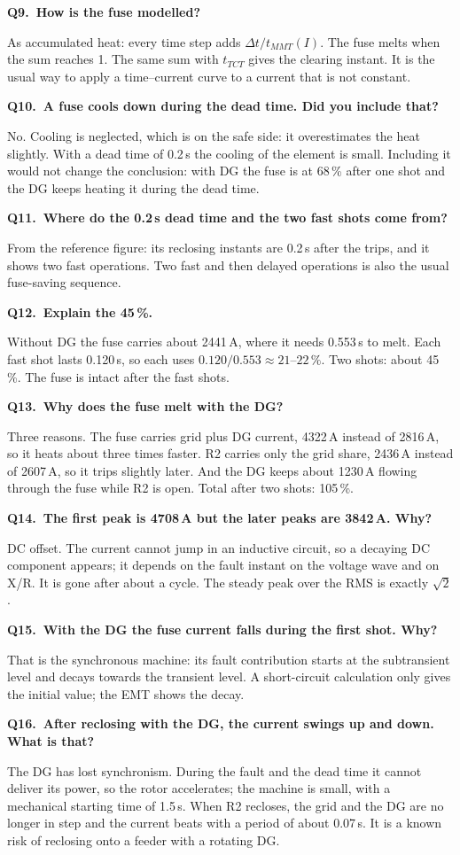 \documentclass[11pt,a4paper]{article}
\newcommand{\sub}[1]{\needspace{5\baselineskip}\medskip{\large\color{navy}\bfseries #1}\par}
\newcommand{\q}[2]{\par\needspace{4\baselineskip}\medskip\noindent\textbf{Q#1.\ #2}\par\noindent}
\begin{document}
\q{9}{How is the fuse modelled?}
As accumulated heat: every time step adds $\Delta t/t_{MMT}(I)$. The fuse melts when the sum reaches 1. The same
sum with $t_{TCT}$ gives the clearing instant. It is the usual way to apply a time--current curve to a current
that is not constant.

\q{10}{A fuse cools down during the dead time. Did you include that?}
No. Cooling is neglected, which is on the safe side: it overestimates the heat slightly. With a dead time of
0.2\,s the cooling of the element is small. Including it would not change the conclusion: with DG the fuse is
at 68\,\% after one shot and the DG keeps heating it during the dead time.

\q{11}{Where do the 0.2\,s dead time and the two fast shots come from?}
From the reference figure: its reclosing instants are 0.2\,s after the trips, and it shows two fast operations.
Two fast and then delayed operations is also the usual fuse-saving sequence.

\sub{The results}
\q{12}{Explain the 45\,\%.}
Without DG the fuse carries about 2441\,A, where it needs 0.553\,s to melt. Each fast shot lasts 0.120\,s, so
each uses $0.120/0.553\approx 21$--$22\,\%$. Two shots: about 45\,\%. The fuse is intact after the fast shots.

\q{13}{Why does the fuse melt with the DG?}
Three reasons. The fuse carries grid plus DG current, 4322\,A instead of 2816\,A, so it heats about three times
faster. R2 carries only the grid share, 2436\,A instead of 2607\,A, so it trips slightly later. And the DG
keeps about 1230\,A flowing through the fuse while R2 is open. Total after two shots: 105\,\%.

\q{14}{The first peak is 4708\,A but the later peaks are 3842\,A. Why?}
DC offset. The current cannot jump in an inductive circuit, so a decaying DC component appears; it depends on
the fault instant on the voltage wave and on X/R. It is gone after about a cycle. The steady peak over the RMS
is exactly $\sqrt{2}$.

\q{15}{With the DG the fuse current falls during the first shot. Why?}
That is the synchronous machine: its fault contribution starts at the subtransient level and decays towards the
transient level. A short-circuit calculation only gives the initial value; the EMT shows the decay.

\q{16}{After reclosing with the DG, the current swings up and down. What is that?}
The DG has lost synchronism. During the fault and the dead time it cannot deliver its power, so the rotor
accelerates; the machine is small, with a mechanical starting time of 1.5\,s. When R2 recloses, the grid and
the DG are no longer in step and the current beats with a period of about 0.07\,s. It is a known risk of
reclosing onto a feeder with a rotating DG.
\end{document}

